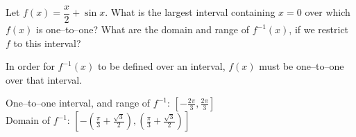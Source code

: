 \begin{question}
Let $f(x)=\dfrac{x}{2}+\sin x$. What is the largest interval containing $x=0$ over which  $f(x)$ is one--to--one?  What are the domain and range of $f^{-1}(x)$, if we restrict $f$ to this interval?
\end{question}
\begin{hint}
In order for $f^{-1}(x)$ to be defined over an interval, $f(x)$ must be one--to--one over that interval.
\end{hint}
\begin{answer}
One--to--one interval, and range of $f^{-1}$: $\left[-\frac{2\pi}{3},\frac{2\pi}{3}\right]$ \\
Domain of $f^{-1}$: $\left[-\left(\frac{\pi}{3}+\frac{\sqrt{3}}{2}\right),\left(\frac{\pi}{3}+\frac{\sqrt{3}}{2}\right)\right]$
\end{answer}
